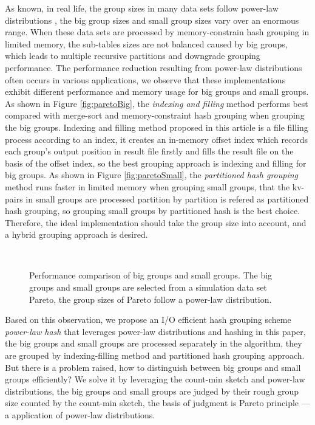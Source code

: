 As known, in real life, the group sizes in many data sets follow power-law distributions \cite{MEJPower}, the big group sizes and small group sizes vary over an enormous range. When these data sets are processed by memory-constrain hash grouping in limited memory, the sub-tables sizes are not balanced caused by big groups, which leads to multiple recursive partitions and downgrade grouping performance. The performance reduction resulting from power-law distributions often occurs in various applications, we observe that these implementations exhibit different performance and memory usage for big groups and small groups. As shown in Figure \ref{fig:paretoBig}, the \emph{indexing and filling} method performs best compared with merge-sort and memory-constraint hash grouping when grouping the big groups. Indexing and filling method proposed in this article is a file filling process according to an index, it creates an in-memory offset index which records each group's output position in result file firstly and fills the result file on the basis of the offset index, so the best grouping approach is indexing and filling for big groups. As shown in Figure \ref{fig:paretoSmall}, the \emph{partitioned hash grouping} method runs faster in limited memory when grouping small groups, that the kv-pairs in small groups are processed partition by partition is refered as partitioned hash grouping, so grouping small groups by partitioned hash is the best choice. Therefore, the ideal implementation should take the group size into account, and a hybrid grouping approach is desired.

\begin{figure}[htbp]%
    \hspace{0.23cm}
    \\
\caption{Performance comparison of big groups and small groups. The big groups and small groups are selected from a simulation data set Pareto, the group sizes of Pareto follow a power-law distribution.}
\label{fig: big and small}
\end{figure}


Based on this observation, we propose an I/O efficient hash grouping scheme \emph{power-law hash} that leverages power-law distributions and hashing in this paper, the big groups and small groups are processed separately in the algorithm, they are grouped by indexing-filling method and partitioned hash grouping approach. But there is a problem raised, how to distinguish between big groups and small groups efficiently? We solve it by leveraging the count-min sketch\cite{Cormode2009Count} and power-law distributions, the big groups and small groups are judged by their rough group size counted by the count-min sketch, the basis of judgment is Pareto principle\cite{MEJPower} --- a application of power-law distributions.

